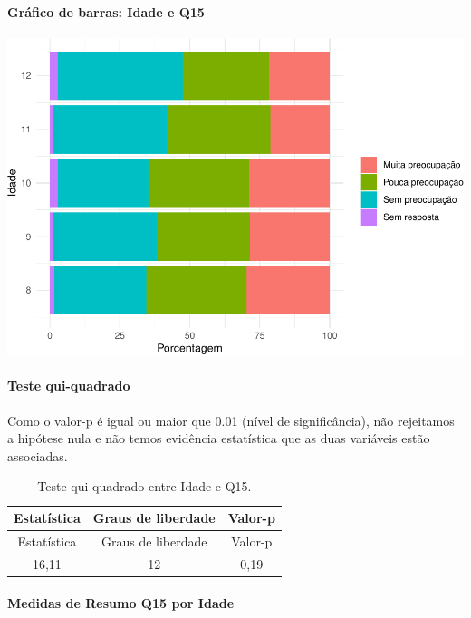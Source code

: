 \documentclass[]{article}
\let\oldparagraph\paragraph
\renewcommand{\paragraph}[1]{\oldparagraph{#1}\mbox{}}
\begin{document}
\hypertarget{gruxe1fico-de-barras-idade-e-q15}{%
\paragraph{Gráfico de barras: Idade e Q15}\label{gruxe1fico-de-barras-idade-e-q15}}

\begin{center}\includegraphics[width=0.75\linewidth]{relatorio_covid19_files/figure-latex/unnamed-chunk-92-1} \end{center}

\hypertarget{teste-qui-quadrado-9}{%
\paragraph{Teste qui-quadrado}\label{teste-qui-quadrado-9}}

Como o valor-p é igual ou maior que 0.01 (nível de significância), não rejeitamos a hipótese nula e não temos evidência estatística que as duas variáveis estão associadas.

\begin{longtable}[]{@{}ccc@{}}
\caption{\label{tab:unnamed-chunk-94}Teste qui-quadrado entre Idade e Q15.}\tabularnewline
\toprule
Estatística & Graus de liberdade & Valor-p\tabularnewline
\midrule
\endfirsthead
\toprule
Estatística & Graus de liberdade & Valor-p\tabularnewline
\midrule
\endhead
16,11 & 12 & 0,19\tabularnewline
\bottomrule
\end{longtable}

\cleardoublepage

\hypertarget{medidas-de-resumo-q15-por-idade}{%
\paragraph{Medidas de Resumo Q15 por Idade}\label{medidas-de-resumo-q15-por-idade}}
\end{document}

